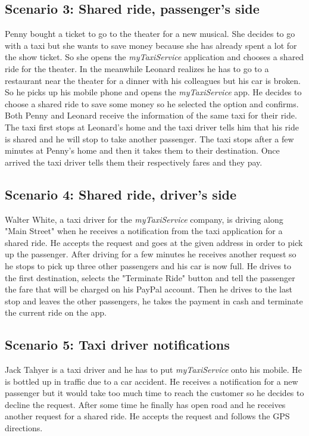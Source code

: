 \documentclass{article}
\begin{document}
\subsection{Scenario 3: Shared ride, passenger's side}
Penny bought a ticket to go to the theater for a new musical. She decides to go with a taxi but she wants to save money because she has already spent a lot for the show ticket. So she opens the \textit{myTaxiService} application and chooses a shared ride for the theater.
In the meanwhile Leonard realizes he has to go to a restaurant near the theater for a dinner with his colleagues but his car is broken. So he picks up his mobile phone and opens the \textit{myTaxiService} app. He decides to choose a shared ride to save some money so he selected the option and confirms.
Both Penny and Leonard receive the information of the same taxi for their ride. The taxi first stops at Leonard's home and the taxi driver tells him that his ride is shared and he will stop to take another passenger. The taxi stops after a few minutes at Penny's home and then it takes them to their destination. Once arrived the taxi driver tells them their respectively fares and they pay.

\subsection{Scenario 4: Shared ride, driver's side}
Walter White, a taxi driver for the \textit{myTaxiService} company, is driving along "Main Street" when he receives a notification from the taxi application for a shared ride. He accepts the request and goes at the given address in order to pick up the passenger. After driving for a few minutes he receives another request so he stops to pick up three other passengers and his car is now full. He drives to the first destination, selects the "Terminate Ride" button and tell the passenger the fare that will be charged on his PayPal account. Then he drives to the last stop and leaves the other passengers, he takes the payment in cash and terminate the current ride on the app.

\subsection{Scenario 5: Taxi driver notifications}
Jack Tahyer is a taxi driver and he has to put \textit{myTaxiService} onto his mobile. He is bottled up in traffic due to a car accident. He receives a notification for a new passenger but it would take too much time to reach the customer so he decides to decline the request. After some time he finally has open road and he receives another request for a shared ride. He accepts the request and follows the GPS directions.
\end{document}
